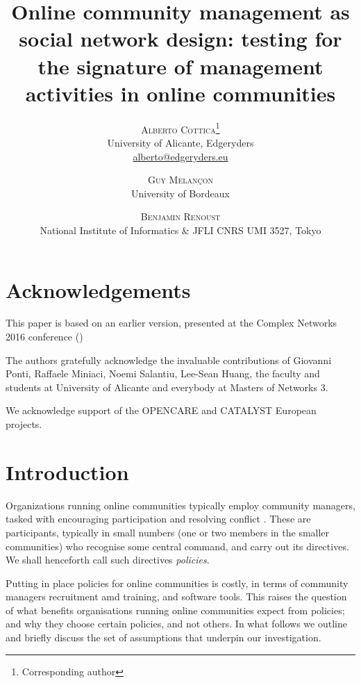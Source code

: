 \documentclass{article}
\title{Online community management as social network design: testing for the signature of management activities in online communities} %
\author{\textsc{Alberto Cottica}\thanks{Corresponding author} \\[1ex] \normalsize University of Alicante, Edgeryders \\ \normalsize \href{mailto:alberto@edgeryders.eu}{alberto@edgeryders.eu}\\
\and \textsc{Guy Melançon}\\
[1ex] \normalsize University of Bordeaux \\ 
\and \textsc{Benjamin Renoust} \\[1ex] 
\normalsize National Institute of Informatics \& JFLI CNRS UMI 3527, Tokyo \\ 
}
\date{} %
\begin{document}
\maketitle


\section*{Acknowledgements}
\noindent This paper is based on an earlier version, presented at the Complex Networks 2016 conference (\cite{cottica2016testing})

\noindent The authors gratefully acknowledge the invaluable contributions of Giovanni Ponti, Raffaele Miniaci, Noemi Salantiu, Lee-Sean Huang, the faculty and students at University of Alicante and everybody at Masters of Networks 3.

\noindent We acknowledge support of the OPENCARE and CATALYST European projects.

\section{Introduction}

Organizations running online communities typically employ community managers, tasked with encouraging participation and resolving conflict \cite{rheingold1993virtual}. 
These are participants, typically in small numbers (one or two members in the smaller communities) who recognise some central command, and carry out its directives. We shall henceforth call such directives \emph{policies}. 

Putting in place policies for online communities is costly, in terms of community managers recruitment amd training, and software tools. This raises the question of what benefits organisations running online communities expect from policies; and why they choose certain policies, and not others. In what follows we outline and briefly discuss the set of assumptions that underpin our investigation.
\end{document}
